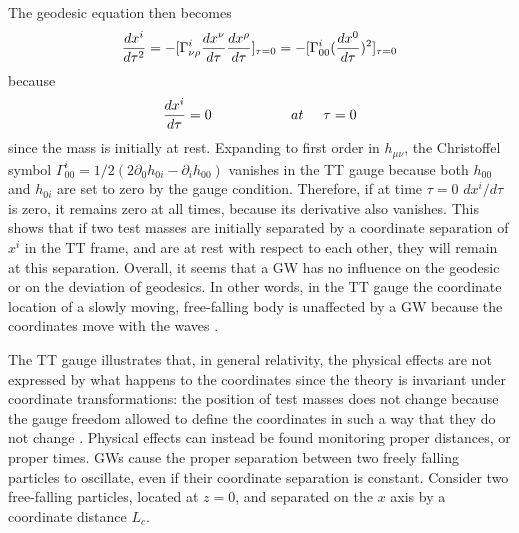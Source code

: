 \documentclass[binding=0.6cm, LaM]{sapthesis}
\begin{document}
	The geodesic equation then becomes
        \begin{equation}
          {{dx^i}\over{d\tau^2}} = -[\Gamma^i_{\nu\rho}{{dx^{\nu}}\over{d\tau}}{{dx^{\rho}}\over{d\tau}}]_{\tau=0} \\ 
          = - [ \Gamma^i_{00}({{dx^0}\over{d\tau}})^2]_{\tau=0}
        \end{equation}
        because
        \begin{equation}
          {{dx^i}\over{d\tau}} = 0 \hspace*{2cm} at \hspace*{0.5cm}\tau = 0
        \end{equation}
        since the mass is initially at rest. Expanding to first order in $h_{\mu\nu}$,
        the Christoffel symbol $\Gamma^i_{00} = 1/2(2\partial_{0}h_{0i} - \partial_i h_{00})$ vanishes in the TT gauge
        because both $h_{00}$ and $h_{0i}$ are set to zero by the gauge condition.
        Therefore, if at time $\tau = 0$ $dx^i/d\tau$ is zero, it remains zero at all times,
        because its derivative also vanishes.
        This shows that if two test masses are initially separated by a coordinate separation of $x^i$ in the TT frame,
        and are at rest with respect to each other, they will remain at this separation.
        Overall, it seems that a GW has no influence on the geodesic or on the deviation of geodesics. 
        In other words, in the TT gauge the coordinate location of a slowly moving, free-falling body is unaffected
        by a GW because the coordinates move with the waves \cite{4}.

        The TT gauge illustrates that, in general relativity, the physical effects are not expressed by what happens
        to the coordinates since the theory is invariant under coordinate transformations:
        the position of test masses does not change because the gauge freedom allowed to define the coordinates
        in such a way that they do not change \cite{3}.
        Physical effects can instead be found monitoring proper distances, or proper times. 
        GWs cause the proper separation between two freely falling particles to oscillate,
        even if their coordinate separation is constant. Consider two free-falling particles,
        located at $z = 0$, and separated on the $x$ axis by a coordinate distance $L_c$.
\end{document}
